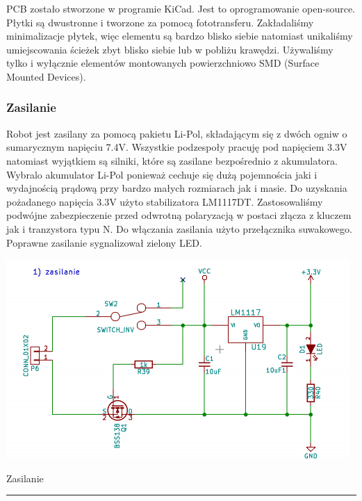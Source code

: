 \documentclass[12pt,a4paper]{article}
\begin{document}
PCB zostało stworzone w programie KiCad. Jest to oprogramowanie open-source. Płytki są dwustronne i tworzone za pomocą fototransferu. Zakładaliśmy minimalizacje płytek, więc elementu są bardzo blisko siebie natomiast unikaliśmy umiejscowania ścieżek zbyt blisko siebie lub w pobliżu krawędzi. Używaliśmy tylko i wyłącznie elementów montowanych powierzchniowo SMD (Surface Mounted Devices).

\subsubsection{Zasilanie}

Robot jest zasilany za pomocą pakietu Li-Pol, składającym się z dwóch ogniw o sumarycznym napięciu 7.4V. Wszystkie podzespoły pracuję pod napięciem 3.3V natomiast wyjątkiem są silniki, które są zasilane bezpośrednio z akumulatora. Wybralo akumulator Li-Pol ponieważ cechuje się dużą pojemnościa jaki i wydajnością prądową przy bardzo małych rozmiarach jak i masie. Do uzyskania pożadanego napięcia 3.3V użyto stabilizatora LM1117DT. Zastosowaliśmy podwójne zabezpieczenie przed odwrotną polaryzacją w postaci złącza z kluczem jak i tranzystora typu N. Do włączania zasilania użyto przełącznika suwakowego. Poprawne zasilanie sygnalizował zielony LED.

\begin{center}
\includegraphics[scale=0.8]{zasilanie.png}
\caption{Zasilanie}
\vspace*{1cm}
\noindent \rule{\linewidth}{0.4mm}
\end{center}

\end{document}
